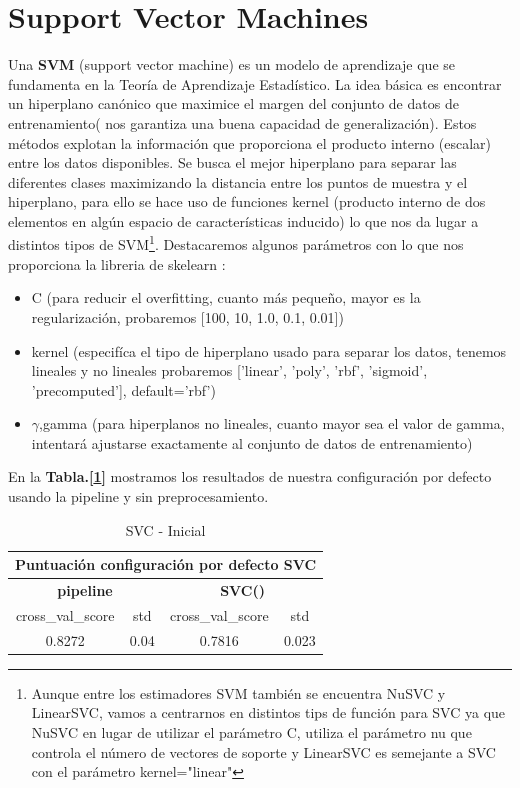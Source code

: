 \documentclass[12pt,twoside]{report}
\begin{document}
\section*{Support Vector Machines}

Una \textbf{SVM} (support vector machine) es un modelo de aprendizaje que se fundamenta en la Teoría de Aprendizaje Estadístico. La idea básica es encontrar un hiperplano canónico que maximice el margen del conjunto de datos de entrenamiento( nos garantiza una buena capacidad de generalización). Estos métodos explotan la información que proporciona el producto interno (escalar) entre los datos disponibles. Se busca el mejor hiperplano para separar las diferentes clases maximizando la distancia entre los puntos de muestra y el hiperplano, para ello se hace uso de funciones kernel (producto interno de dos elementos en algún espacio de características inducido) lo que nos da lugar a distintos tipos de SVM\footnote{Aunque entre los estimadores SVM también se encuentra NuSVC y LinearSVC, vamos a centrarnos en distintos tips de función para SVC ya que NuSVC en lugar de utilizar el parámetro C, utiliza el parámetro nu que controla el número de vectores de soporte y LinearSVC es semejante a SVC con el parámetro kernel="linear"}. Destacaremos algunos parámetros con lo que nos proporciona la libreria de skelearn \cite{svm}:

\begin{itemize}
	\item C (para reducir el overfitting, cuanto más pequeño, mayor es la regularización, probaremos [100, 10, 1.0, 0.1, 0.01])
	\item kernel (especifíca el tipo de hiperplano usado para separar los datos, tenemos lineales y no lineales probaremos ['linear', 'poly', 'rbf', 'sigmoid', 'precomputed'], default=’rbf’)
	\item $\gamma$,gamma (para hiperplanos no lineales, cuanto mayor sea el valor de gamma, intentará ajustarse exactamente al conjunto de datos de entrenamiento)
\end{itemize}

En la \textbf{Tabla.[\ref{svc:inicial}]} mostramos los resultados de nuestra configuración por defecto usando la pipeline y sin preprocesamiento.

\begin{table}[h]
\begin{center}
  \begin{tabular}{|c|c|c|c|}
  \hline
    \multicolumn{4}{|c|}{\textbf{Puntuación configuración por defecto SVC}} \\  
    \hline
    \multicolumn{2}{|c|}{\textbf{pipeline}} & \multicolumn{2}{|c|}{\textbf{SVC()}}\\    
    \hline
   cross\_val\_score & std & cross\_val\_score & std  \\ 
   \hline
0.8272 & 0.04 & 0.7816 & 0.023  \\ 
\hline
  \end{tabular}
  \end{center}
\caption{SVC - Inicial}
\label{svc:inicial}
\end{table}
\end{document}
